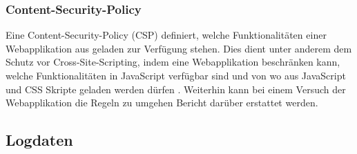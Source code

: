 \subsubsection{Content-Security-Policy}


Eine Content-Security-Policy (CSP) definiert, welche Funktionalitäten einer Webapplikation aus geladen zur Verfügung stehen. Dies dient unter anderem dem Schutz vor Cross-Site-Scripting, indem eine Webapplikation beschränken kann, welche Funktionalitäten in JavaScript verfügbar sind und von wo aus JavaScript und CSS Skripte geladen werden dürfen \cite{MDNContentSecurityPolicy}. Weiterhin kann bei einem Versuch der Webapplikation die Regeln zu umgehen Bericht darüber erstattet werden.


%
%
%
%

\subsection{Logdaten}

